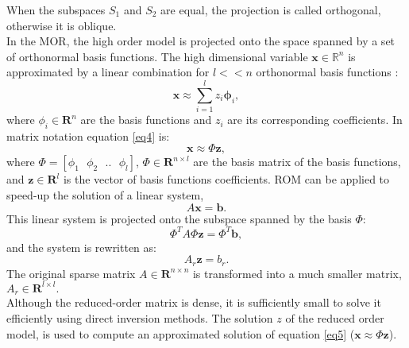 \documentclass[12pt]{report}
\begin{document}
When the subspaces $S_1$ and $S_2$ are equal, the projection is called orthogonal, otherwise it is oblique.\\
In the MOR, the high order model is projected onto the space
spanned by a set of orthonormal basis functions. The high dimensional variable $\mathbf{x} \in \mathbb{R}^n$
is approximated by a linear combination for $l<<n$ orthonormal basis functions \cite{Astrid11}:
\begin{equation}\label{eq4}
  \mathbf{x}\approx \sum_{i=1}^lz_i \mathbf{\phi}_i,
\end{equation}
where $\phi_i \in \mathbf{R}^n$ are the basis functions and $z_i$ are its corresponding coefficients.
In matrix notation equation \eqref{eq4} is:
$$\mathbf{x}\approx \Phi\mathbf{z},$$
where $\Phi=[\phi_1 \text{ }\phi_2 \text{ }.. \text{ }\phi_l]$, $\Phi \in \mathbf{R}^{n\times l}$ are the basis matrix 
of the basis functions, and $\mathbf{z} \in \mathbf{R}^l$ is the vector of basis functions coefficients. 
ROM can be applied to speed-up the solution of a linear system,
\begin{equation}\label{eq5}
 A\mathbf{x}=\mathbf{b}.
\end{equation}
This linear system is projected onto the subspace spanned by the basis $\Phi$:
$$\Phi^TA\Phi \mathbf{z}=\Phi^T\mathbf{b},$$
and the system is rewritten as:
$$A_r\mathbf{z}=b_r.$$
The original sparse matrix $A \in \mathbf{R}^{n\times n}$ is transformed into a much smaller matrix,
$A_r \in \mathbf{R}^{l\times l}.$ \\
Although the reduced-order matrix is dense, it is sufficiently small to solve it efficiently using direct 
inversion methods.
The solution $z$ of the reduced order model, is used
to compute an approximated solution of equation \eqref{eq5} ($\mathbf{x} \approx \Phi \mathbf{z}$).\\
\end{document}
